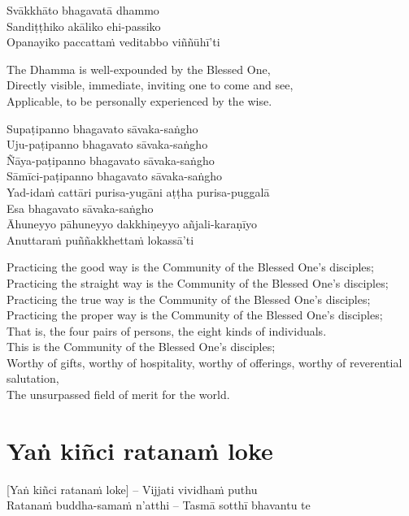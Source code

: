 Svākkhāto bhagavatā dhammo\\
Sandiṭṭhiko akāliko ehi-passiko\\
Opanayiko paccattaṁ veditabbo viññūhī'ti

\begin{english-verses}
  The Dhamma is well-expounded by the Blessed One,\\
  Directly visible, immediate, inviting one to come and see,\\
  Applicable, to be personally experienced by the wise.
\end{english-verses}

Supaṭipanno bhagavato sāvaka-saṅgho\\
Uju-paṭipanno bhagavato sāvaka-saṅgho\\
Ñāya-paṭipanno bhagavato sāvaka-saṅgho\\
Sāmīci-paṭipanno bhagavato sāvaka-saṅgho\\
Yad-idaṁ cattāri purisa-yugāni aṭṭha purisa-puggalā\\
Esa bhagavato sāvaka-saṅgho\\
Āhuneyyo pāhuneyyo dakkhiṇeyyo añjali-karaṇīyo\\
Anuttaraṁ puññakkhettaṁ lokassā'ti

\begin{english-verses}
  Practicing the good way is the Community of the Blessed One's disciples;\\
  Practicing the straight way is the Community of the Blessed One's disciples;\\
  Practicing the true way is the Community of the Blessed One's disciples;\\
  Practicing the proper way is the Community of the Blessed One's disciples;\\
  That is, the four pairs of persons, the eight kinds of individuals.\\
  This is the Community of the Blessed One's disciples;\\
  Worthy of gifts, worthy of hospitality, worthy of offerings, worthy of reverential salutation,\\
  The unsurpassed field of merit for the world.
\end{english-verses}

\suttaRef{[SN 11.3]}

\section{Yaṅ kiñci ratanaṁ loke}
\label{yan-kinci-ratanam-loke}
[Yaṅ kiñci ratanaṁ loke] – Vijjati vividhaṁ puthu\\
Ratanaṁ buddha-samaṁ n'atthi – Tasmā sotthī bhavantu te

